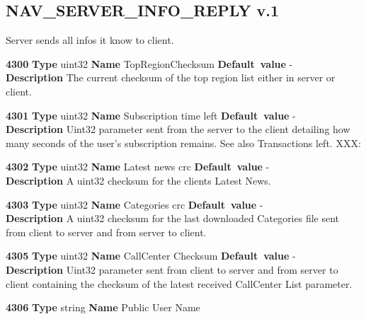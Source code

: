 \subsection{NAV\_SERVER\_INFO\_REPLY v.1}

Server sends all infos it know to client.

\begin{list}{\textbf{ParamID}}{}
\item \textbf{4300} \textbf{Type} uint32 \textbf{Name} TopRegionChecksum
                 \textbf{Default~value} - \\
  \label{TopRegionChecksum}
  \textbf{Description} The current checksum of the top region list either in
                       server or client.
\item \textbf{4301} \textbf{Type} uint32 \textbf{Name} Subscription time left
                 \textbf{Default~value} - \\
  \textbf{Description} Uint32 parameter sent from the server to the client 
                       detailing how many seconds of the user's subscription
                       remains. See also Transactions left. XXX:
\item \textbf{4302} \textbf{Type} uint32 \textbf{Name}  Latest news crc
                 \textbf{Default~value} - \\
  \label{Latest news crc}
  \textbf{Description} A uint32 checksum for the clients Latest News.
\item \textbf{4303} \textbf{Type} uint32 \textbf{Name} Categories crc
                 \textbf{Default~value} - \\
  \label{Categories crc}
  \textbf{Description} A uint32 checksum for the last downloaded Categories 
  file sent from client to server and from server to client.
\item \textbf{4305} \textbf{Type} uint32 \textbf{Name} CallCenter Checksum 
                 \textbf{Default~value} - \\
  \label{CallCenter Checksum}
  \textbf{Description} Uint32 parameter sent from client to server and from 
  server to client containing the checksum of the latest received CallCenter
  List parameter.
\item \textbf{4306} \textbf{Type} string \textbf{Name} Public User Name 

\end{list}

